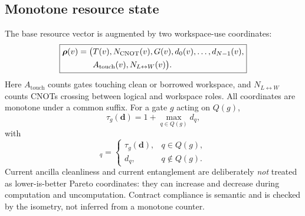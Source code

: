 \subsection{Monotone resource state}

The base resource vector is augmented by two workspace-use coordinates:
\begin{equation}
\boxed{
\begin{aligned}
\boldsymbol{\rho}(v)=\bigl(&T(v),N_{\mathrm{CNOT}}(v),G(v),
 d_0(v),\ldots,d_{N-1}(v),\\
& A_{\mathrm{touch}}(v),N_{L\leftrightarrow W}(v)\bigr).
\end{aligned}
}
\label{eq:resource-vector}
\end{equation}
Here $A_{\mathrm{touch}}$ counts gates touching clean or borrowed workspace, and $N_{L\leftrightarrow W}$ counts CNOTs crossing between logical and workspace roles. All coordinates are monotone under a common suffix. For a gate $g$ acting on $Q(g)$,
\begin{equation}
\tau_g(\mathbf d)=1+\max_{q\in Q(g)}d_q,
\end{equation}
with
\begin{equation}
[T_g(\mathbf d)]_q=
\begin{cases}
\tau_g(\mathbf d),&q\in Q(g),\\
d_q,&q\notin Q(g).
\end{cases}
\label{eq:depth-update}
\end{equation}
Current ancilla cleanliness and current entanglement are deliberately \emph{not} treated as lower-is-better Pareto coordinates: they can increase and decrease during computation and uncomputation. Contract compliance is semantic and is checked by the isometry, not inferred from a monotone counter.
